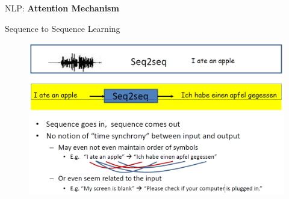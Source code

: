 \begin{frame}{}
    \LARGE NLP: \textbf{Attention Mechanism}
\end{frame}

\begin{frame}{Sequence to Sequence Learning}
    \begin{figure}
        \centering
        \includegraphics[width=\linewidth, height=0.9\textheight,keepaspectratio]{images/nlp/seq2seq.png}
    \end{figure}
\end{frame}

